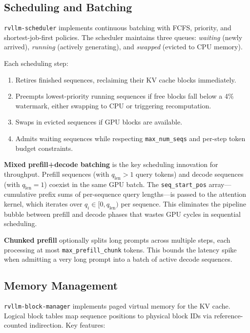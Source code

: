 \documentclass[11pt,a4paper]{article}
\begin{document}
\subsection{Scheduling and Batching}

\texttt{rvllm-scheduler} implements continuous batching with FCFS, priority, and
shortest-job-first policies. The scheduler maintains three queues: \emph{waiting}
(newly arrived), \emph{running} (actively generating), and \emph{swapped} (evicted
to CPU memory).

Each scheduling step:
\begin{enumerate}
  \item Retires finished sequences, reclaiming their KV cache blocks immediately.
  \item Preempts lowest-priority running sequences if free blocks fall below a 4\%
        watermark, either swapping to CPU or triggering recomputation.
  \item Swaps in evicted sequences if GPU blocks are available.
  \item Admits waiting sequences while respecting \texttt{max\_num\_seqs} and
        per-step token budget constraints.
\end{enumerate}

\textbf{Mixed prefill+decode batching} is the key scheduling innovation for
throughput. Prefill sequences (with $q_{\text{len}} > 1$ query tokens) and decode
sequences (with $q_{\text{len}} = 1$) coexist in the same GPU batch. The
\texttt{seq\_start\_pos} array---cumulative prefix sums of per-sequence query
lengths---is passed to the attention kernel, which iterates over
$q_i \in [0, q_{\text{len}})$ per sequence. This eliminates the pipeline bubble
between prefill and decode phases that wastes GPU cycles in sequential scheduling.

\textbf{Chunked prefill} optionally splits long prompts across multiple steps,
each processing at most \texttt{max\_prefill\_chunk} tokens. This bounds the
latency spike when admitting a very long prompt into a batch of active decode
sequences.

\subsection{Memory Management}

\texttt{rvllm-block-manager} implements paged virtual memory for the KV cache.
Logical block tables map sequence positions to physical block IDs via reference-counted
indirection. Key features:
\end{document}
